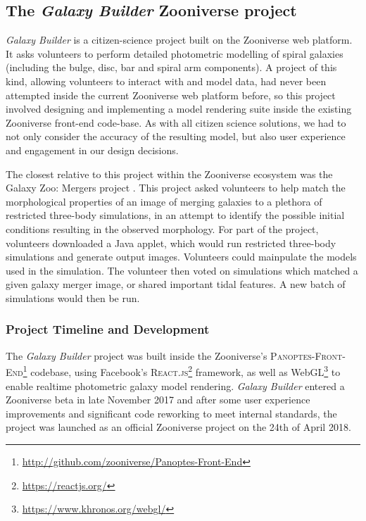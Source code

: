 \documentclass[../main.tex]{subfiles}
\begin{document}
\label{sec:method}

\subsection{The \textit{Galaxy Builder} Zooniverse project}

\textit{Galaxy Builder} is a citizen-science project built on the Zooniverse web platform. It asks volunteers to perform detailed photometric modelling of spiral galaxies (including the bulge, disc, bar and spiral arm components). A project of this kind, allowing volunteers to interact with and model data, had never been attempted inside the current Zooniverse web platform before, so this project involved designing and implementing a model rendering suite inside the existing Zooniverse front-end code-base. As with all citizen science solutions, we had to not only consider the accuracy of the resulting model, but also user experience and engagement in our design decisions.

The closest relative to this project within the Zooniverse ecosystem was the Galaxy Zoo: Mergers project \citep{Holincheck2016:1604.00435v1}. This project asked volunteers to help match the morphological properties of an image of merging galaxies to a plethora of restricted three-body simulations, in an attempt to identify the possible initial conditions resulting in the observed morphology. For part of the project, volunteers downloaded a Java applet, which would run restricted three-body simulations and generate output images. Volunteers could mainpulate the models used in the simulation. The volunteer then voted on simulations which matched a given galaxy merger image, or shared important tidal features. A new batch of simulations would then be run. 

\subsubsection{Project Timeline and Development}

The \textit{Galaxy Builder} project was built inside the Zooniverse's \citep{Simpson:2014:ZOW:2567948.2579215} \textsc{Panoptes-Front-End}\footnote{\url{http://github.com/zooniverse/Panoptes-Front-End}} codebase, using Facebook's \textsc{React.js}\footnote{\url{https://reactjs.org/}} framework, as well as WebGL\footnote{\url{https://www.khronos.org/webgl/}} to enable realtime photometric galaxy model rendering. \textit{Galaxy Builder} entered a Zooniverse beta in late November 2017 and after some user experience improvements and significant code reworking to meet internal standards, the project was launched as an official Zooniverse project on the 24th of April 2018.
\end{document}
